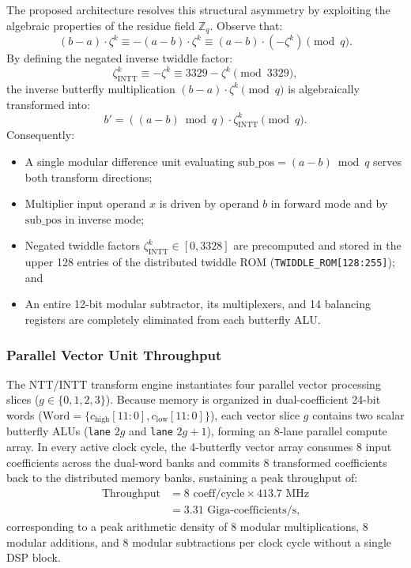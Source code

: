 The proposed architecture resolves this structural asymmetry by exploiting the algebraic properties of the residue field $\mathbb{Z}_q$. Observe that:
\begin{equation}
\label{eq:modular_negation_identity}
(b - a) \cdot \zeta^k \equiv -(a - b) \cdot \zeta^k \equiv (a - b) \cdot \left(-\zeta^k\right) \pmod q.
\end{equation}
By defining the negated inverse twiddle factor:
\begin{equation}
\label{eq:negated_twiddle_def}
\zeta_{\text{INTT}}^k \equiv -\zeta^k \equiv 3329 - \zeta^k \pmod{3329},
\end{equation}
the inverse butterfly multiplication $(b - a) \cdot \zeta^k \pmod q$ is algebraically transformed into:
\begin{equation}
\label{eq:gs_optimized_math}
b' = \left((a - b) \bmod q\right) \cdot \zeta_{\text{INTT}}^k \pmod q.
\end{equation}
Consequently:
\begin{itemize}
    \item A single modular difference unit evaluating $\text{sub\_pos} = (a - b) \bmod q$ serves both transform directions;
    \item Multiplier input operand $x$ is driven by operand $b$ in forward mode and by $\text{sub\_pos}$ in inverse mode;
    \item Negated twiddle factors $\zeta_{\text{INTT}}^k \in [0, 3328]$ are precomputed and stored in the upper 128 entries of the distributed twiddle ROM (\texttt{TWIDDLE\_ROM[128:255]}); and
    \item An entire 12-bit modular subtractor, its multiplexers, and 14 balancing registers are completely eliminated from each butterfly ALU.
\end{itemize}

\subsubsection{Parallel Vector Unit Throughput}
The NTT/INTT transform engine instantiates four parallel vector processing slices ($g \in \{0, 1, 2, 3\}$). Because memory is organized in dual-coefficient 24-bit words ($\text{Word} = \{c_{\text{high}}[11:0], c_{\text{low}}[11:0]\}$), each vector slice $g$ contains two scalar butterfly ALUs (\texttt{lane} $2g$ and \texttt{lane} $2g+1$), forming an 8-lane parallel compute array. In every active clock cycle, the 4-butterfly vector array consumes 8 input coefficients across the dual-word banks and commits 8 transformed coefficients back to the distributed memory banks, sustaining a peak throughput of:
\begin{equation}
\label{eq:throughput_density}
\begin{aligned}
\text{Throughput} &= 8 \text{ coeff/cycle} \times 413.7\text{ MHz} \\
&= 3.31\text{ Giga-coefficients/s},
\end{aligned}
\end{equation}
corresponding to a peak arithmetic density of 8 modular multiplications, 8 modular additions, and 8 modular subtractions per clock cycle without a single DSP block.

